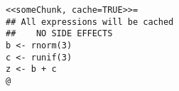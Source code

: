 \begin{verbatim}
<<someChunk, cache=TRUE>>=
## All expressions will be cached
##    NO SIDE EFFECTS 
b <- rnorm(3)
c <- runif(3)
z <- b + c
@ 
\end{verbatim}
